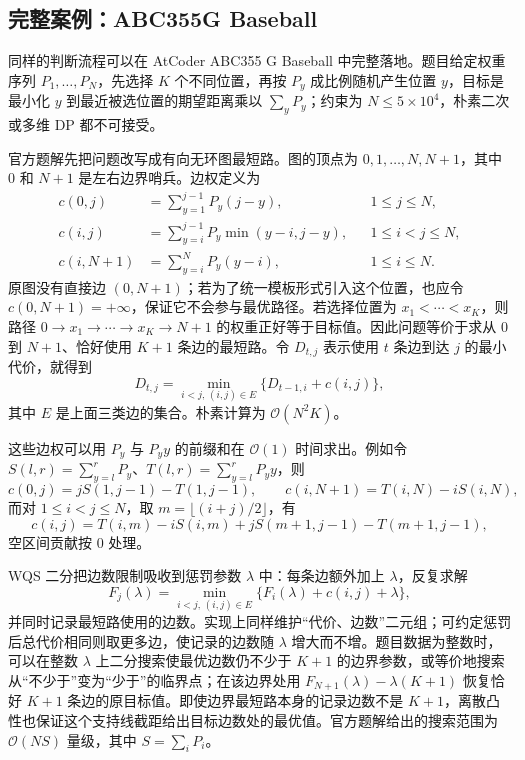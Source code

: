 \documentclass[lang=cn,a4paper,newtx,code=minted,bibtex]{elegantpaper}
\newcommand{\BigO}{\mathcal{O}}
\begin{document}
\subsection{完整案例：ABC355G Baseball}

同样的判断流程可以在 AtCoder ABC355 G Baseball 中完整落地。题目给定权重序列 $P_1,\ldots,P_N$，先选择 $K$ 个不同位置，再按 $P_y$ 成比例随机产生位置 $y$，目标是最小化 $y$ 到最近被选位置的期望距离乘以 $\sum_y P_y$；约束为 $N\le 5\times 10^4$，朴素二次或多维 DP 都不可接受\cite{atcoder2024abc355g-task}。

官方题解先把问题改写成有向无环图最短路\cite{atcoder2024abc355g}。图的顶点为 $0,1,\ldots,N,N+1$，其中 $0$ 和 $N+1$ 是左右边界哨兵。边权定义为
\begin{align}
  c(0,j)&=\sum_{y=1}^{j-1} P_y(j-y), &&1\le j\le N, \\
  c(i,j)&=\sum_{y=i}^{j-1} P_y\min(y-i,j-y), &&1\le i<j\le N, \\
  c(i,N+1)&=\sum_{y=i}^{N} P_y(y-i), &&1\le i\le N .
  \label{eq:baseball-cost}
\end{align}
原图没有直接边 $(0,N+1)$；若为了统一模板形式引入这个位置，也应令 $c(0,N+1)=+\infty$，保证它不会参与最优路径。若选择位置为 $x_1<\cdots<x_K$，则路径 $0\to x_1\to\cdots\to x_K\to N+1$ 的权重正好等于目标值。因此问题等价于求从 $0$ 到 $N+1$、恰好使用 $K+1$ 条边的最短路。令 $D_{t,j}$ 表示使用 $t$ 条边到达 $j$ 的最小代价，就得到
\[
  D_{t,j}=\min_{i<j,\,(i,j)\in E}\{D_{t-1,i}+c(i,j)\},
\]
其中 $E$ 是上面三类边的集合。朴素计算为 $\BigO(N^2K)$。

这些边权可以用 $P_y$ 与 $P_y y$ 的前缀和在 $\BigO(1)$ 时间求出。例如令 $S(l,r)=\sum_{y=l}^rP_y$、$T(l,r)=\sum_{y=l}^rP_yy$，则
\[
  c(0,j)=jS(1,j-1)-T(1,j-1),\qquad
  c(i,N+1)=T(i,N)-iS(i,N),
\]
而对 $1\le i<j\le N$，取 $m=\lfloor(i+j)/2\rfloor$，有
\[
  c(i,j)=T(i,m)-iS(i,m)+jS(m+1,j-1)-T(m+1,j-1),
\]
空区间贡献按 $0$ 处理。

WQS 二分把边数限制吸收到惩罚参数 $\lambda$ 中：每条边额外加上 $\lambda$，反复求解
\begin{equation}
  F_j(\lambda)=\min_{i<j,\,(i,j)\in E}\{F_i(\lambda)+c(i,j)+\lambda\},
  \label{eq:baseball-aliens}
\end{equation}
并同时记录最短路使用的边数。实现上同样维护“代价、边数”二元组；可约定惩罚后总代价相同则取更多边，使记录的边数随 $\lambda$ 增大而不增。题目数据为整数时，可以在整数 $\lambda$ 上二分搜索使最优边数仍不少于 $K+1$ 的边界参数，或等价地搜索从“不少于”变为“少于”的临界点；在该边界处用 $F_{N+1}(\lambda)-\lambda(K+1)$ 恢复恰好 $K+1$ 条边的原目标值。即使边界最短路本身的记录边数不是 $K+1$，离散凸性也保证这个支持线截距给出目标边数处的最优值。官方题解给出的搜索范围为 $\BigO(NS)$ 量级，其中 $S=\sum_i P_i$\cite{atcoder2024abc355g}。
\end{document}
